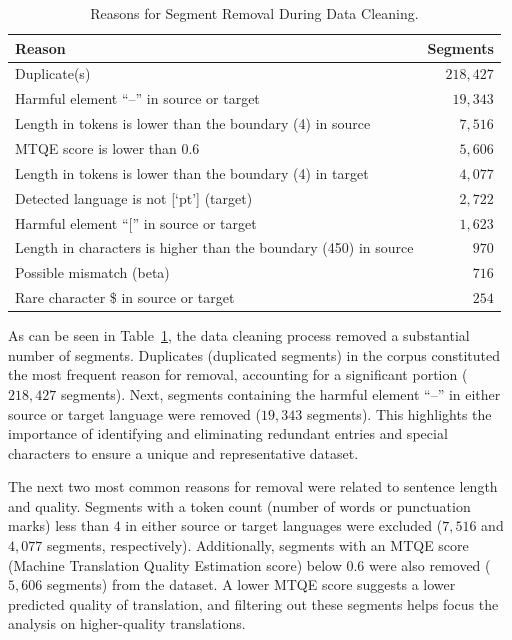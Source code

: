 \begin{table}[htb]
\centering
\begin{tabular}{lr}
\toprule
\textbf{Reason} & \textbf{Segments} \\
\midrule
Duplicate(s) & $218,427$ \\
Harmful element ``--'' in source or target & $19,343$ \\
Length in tokens is lower than the boundary (4) in source & $7,516$ \\
MTQE score is lower than 0.6 & $5,606$ \\
Length in tokens is lower than the boundary (4) in target & $4,077$ \\
Detected language is not [`pt'] (target) & $2,722$ \\
Harmful element ``['' in source or target & $1,623$ \\ 
Length in characters is higher than the boundary (450) in source & $970$ \\
Possible mismatch (beta) & $716$ \\
Rare character \$ in source or target & $254$ \\
\bottomrule
\end{tabular}
\caption{Reasons for Segment Removal During Data Cleaning.}
\label{tab:cleaning_reasons}
\end{table}

As can be seen in Table~\ref{tab:cleaning_reasons}, the data cleaning process removed a substantial number of segments. Duplicates (duplicated segments) in the corpus constituted the most frequent reason for removal, accounting for a significant portion ($218,427$ segments). Next, segments containing the harmful element ``--'' in either source or target language were removed ($19,343$ segments). This highlights the importance of identifying and eliminating redundant entries and special characters to ensure a unique and representative dataset.

The next two most common reasons for removal were related to sentence length and quality. Segments with a token count (number of words or punctuation marks) less than $4$ in either source or target languages were excluded ($7,516$ and $4,077$ segments, respectively). Additionally, segments with an MTQE score (Machine Translation Quality Estimation score) below $0.6$ were also removed ($5,606$ segments) from the dataset. A lower MTQE score suggests a lower predicted quality of translation, and filtering out these segments helps focus the analysis on higher-quality translations.


